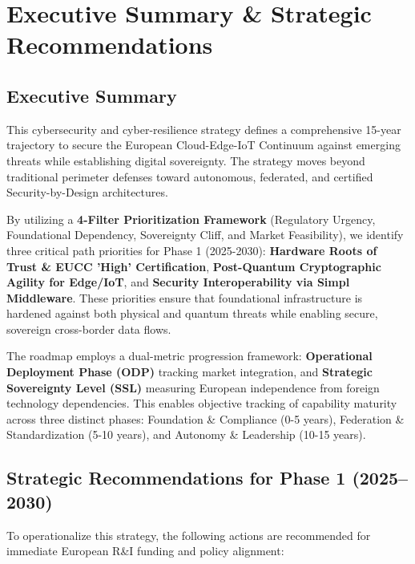 \documentclass[12pt,a4paper]{article}
\begin{document}
\section{Executive Summary \& Strategic Recommendations}

\subsection*{Executive Summary}
This cybersecurity and cyber-resilience strategy defines a comprehensive 15-year trajectory to secure the European Cloud-Edge-IoT Continuum against emerging threats while establishing digital sovereignty. The strategy moves beyond traditional perimeter defenses toward autonomous, federated, and certified Security-by-Design architectures.

By utilizing a \textbf{4-Filter Prioritization Framework} (Regulatory Urgency, Foundational Dependency, Sovereignty Cliff, and Market Feasibility), we identify three critical path priorities for Phase 1 (2025-2030): \textbf{Hardware Roots of Trust \& EUCC 'High' Certification}, \textbf{Post-Quantum Cryptographic Agility for Edge/IoT}, and \textbf{Security Interoperability via Simpl Middleware}. These priorities ensure that foundational infrastructure is hardened against both physical and quantum threats while enabling secure, sovereign cross-border data flows.

The roadmap employs a dual-metric progression framework: \textbf{Operational Deployment Phase (ODP)} tracking market integration, and \textbf{Strategic Sovereignty Level (SSL)} measuring European independence from foreign technology dependencies. This enables objective tracking of capability maturity across three distinct phases: Foundation \& Compliance (0-5 years), Federation \& Standardization (5-10 years), and Autonomy \& Leadership (10-15 years).

\subsection*{Strategic Recommendations for Phase 1 (2025--2030)}
To operationalize this strategy, the following actions are recommended for immediate European R\&I funding and policy alignment:
\end{document}
